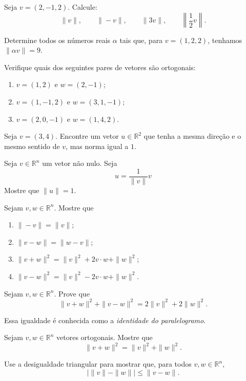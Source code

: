 \begin{exercise}
    Seja $v=(2,-1,2)$.
    Calcule:
    \[
        \|v\|,\qquad \|-v\|,\qquad \|3v\|,\qquad \left\|\frac12v\right\|.
    \]
\end{exercise}

\begin{exercise}
    Determine todos os números reais $\alpha$ tais que, para $v=(1,2,2)$, tenhamos $\|\alpha v\|=9$.
\end{exercise}

\begin{exercise}
    Verifique quais dos seguintes pares de vetores são ortogonais:
    \begin{enumerate}[label=(\alph*)]
        \item $v=(1,2)$ e $w=(2,-1)$;
        \item $v=(1,-1,2)$ e $w=(3,1,-1)$;
        \item $v=(2,0,-1)$ e $w=(1,4,2)$.
    \end{enumerate}
\end{exercise}

\begin{exercise}
    Seja $v=(3,4)$.
    Encontre um vetor $u\in\mathbb R^2$ que tenha a mesma direção e o mesmo sentido de $v$, mas norma igual a $1$.
\end{exercise}

\begin{exercise}
    Seja $v\in\mathbb R^n$ um vetor não nulo.
    Seja
    \[
        u=\frac{1}{\|v\|}v
    \]
    Mostre que $\|u\|=1$.
\end{exercise}

\begin{exercise}
    Sejam $v,w\in\mathbb R^n$.
    Mostre que
    \begin{enumerate}[label=(\alph*)]
        \item $\|-v\|=\|v\|$;
        \item $\|v-w\|=\|w-v\|$;
        \item $\|v+w\|^2=\|v\|^2+2v\cdot w+\|w\|^2$;
        \item $\|v-w\|^2=\|v\|^2-2v\cdot w+\|w\|^2$.
    \end{enumerate}
\end{exercise}

\begin{exercise}
    Sejam $v,w\in\mathbb R^n$.
    Prove que
    \[
        \|v+w\|^2+\|v-w\|^2=2\|v\|^2+2\|w\|^2.
    \]

    Essa igualdade é conhecida como a \emph{identidade do paralelogramo}.
\end{exercise}

\begin{exercise}
    Sejam $v,w\in\mathbb R^n$ vetores ortogonais.
    Mostre que
    \[
        \|v+w\|^2=\|v\|^2+\|w\|^2.
    \]
\end{exercise}

\begin{exercise}
    Use a desigualdade triangular para mostrar que, para todos $v,w\in\mathbb R^n$,
    \[
        \big|\|v\|-\|w\|\big|\leq \|v-w\|.
    \]
\end{exercise}
